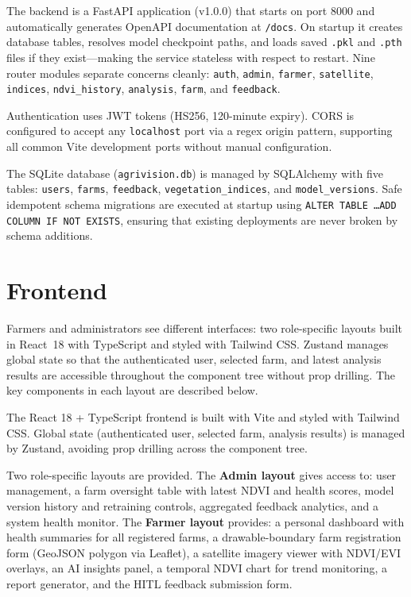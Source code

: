 \documentclass[12pt,a4paper,oneside]{report}
\begin{document}
The backend is a FastAPI application (v1.0.0) that starts on port 8000 and
automatically generates OpenAPI documentation at \texttt{/docs}. On startup it
creates database tables, resolves model checkpoint paths, and loads saved
\texttt{.pkl} and \texttt{.pth} files if they exist—making the service stateless
with respect to restart. Nine router modules separate concerns cleanly:
\texttt{auth}, \texttt{admin}, \texttt{farmer}, \texttt{satellite}, \texttt{indices},
\texttt{ndvi\_history}, \texttt{analysis}, \texttt{farm}, and \texttt{feedback}.

Authentication uses JWT tokens (HS256, 120-minute expiry). CORS is configured to
accept any \texttt{localhost} port via a regex origin pattern, supporting all common
Vite development ports without manual configuration.

The SQLite database (\texttt{agrivision.db}) is managed by SQLAlchemy with five
tables: \texttt{users}, \texttt{farms}, \texttt{feedback}, \texttt{vegetation\_indices},
and \texttt{model\_versions}. Safe idempotent schema migrations are executed at
startup using \texttt{ALTER TABLE \ldots ADD COLUMN IF NOT EXISTS}, ensuring that
existing deployments are never broken by schema additions.

\section{Frontend}

Farmers and administrators see different interfaces: two role-specific layouts built in React~18 with TypeScript and styled with Tailwind CSS. Zustand manages global state so that the authenticated user, selected farm, and latest analysis results are accessible throughout the component tree without prop drilling. The key components in each layout are described below.

The React 18 + TypeScript frontend is built with Vite and styled with Tailwind CSS.
Global state (authenticated user, selected farm, analysis results) is managed by
Zustand, avoiding prop drilling across the component tree.

Two role-specific layouts are provided. The \textbf{Admin layout} gives access to:
user management, a farm oversight table with latest NDVI and health scores, model
version history and retraining controls, aggregated feedback analytics, and a system
health monitor. The \textbf{Farmer layout} provides: a personal dashboard with health
summaries for all registered farms, a drawable-boundary farm registration form
(GeoJSON polygon via Leaflet), a satellite imagery viewer with NDVI/EVI overlays,
an AI insights panel, a temporal NDVI chart for trend monitoring, a report generator,
and the HITL feedback submission form.
\end{document}

